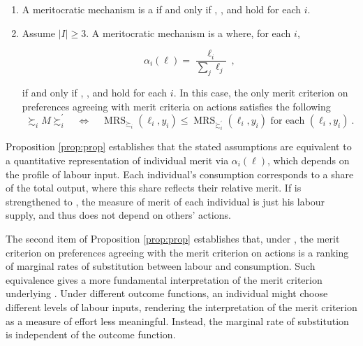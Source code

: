 \begin{prop}\label{prop:prop}

	\begin{enumerate}
		\item A meritocratic mechanism is a  if and only if , , and  hold for each \( i \).
		\item Assume \( | I | \geq 3 \). A meritocratic mechanism is a  where, for each \( i \),

		      \[ \alpha_i (\ell) = \frac{\ell_i}{\sum_j \ell_j} \: , \]

		      if and only if , , and  hold for each \( i \). In this case, the only merit criterion on preferences agreeing with merit criteria on actions satisfies the following
		      \[ \succsim_i M \succsim_i^{\prime} \quad \Longleftrightarrow \quad \operatorname{MRS}_{\succsim_i} ( \ell_i, y_i ) \leq \operatorname{MRS}_{\succsim_i^{\prime}} ( \ell_i, y_i ) \text{ for each } ( \ell_i, y_i ) \: .\]
	\end{enumerate}
\end{prop}

Proposition \ref{prop:prop} establishes that the stated assumptions are equivalent to a quantitative representation of individual merit via \( \alpha_{i} (\ell) \), which depends on the profile of labour input. Each individual’s consumption corresponds to a share of the total output, where this share reflects their relative merit. If  is strengthened to , the measure of merit of each individual is just his labour supply, and thus does not depend on others' actions.

The second item of Proposition \ref{prop:prop} establishes that, under , the merit criterion on preferences agreeing with the merit criterion on actions is a ranking of marginal rates of substitution between labour and consumption. Such equivalence gives a more fundamental interpretation of the merit criterion underlying . Under different outcome functions, an individual might choose different levels of labour inputs, rendering the interpretation of the merit criterion as a measure of effort less meaningful. Instead, the marginal rate of substitution is independent of the outcome function.

